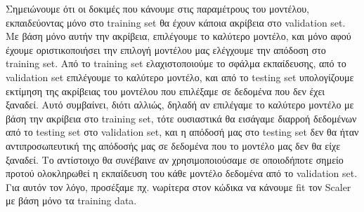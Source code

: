 \noindent Σημειώνουμε ότι οι δοκιμές που κάνουμε στις παραμέτρους του μοντέλου, εκπαιδεύοντας μόνο στο training set θα έχουν κάποια ακρίβεια στο validation set. Με βάση μόνο αυτήν την ακρίβεια, επιλέγουμε το καλύτερο μοντέλο, και μόνο αφού έχουμε οριστικοποιήσει την επιλογή μοντέλου μας ελέγχουμε την απόδοση στο training set. Από το training set ελαχιστοποιούμε το σφάλμα εκπαίδευσης, από το validation set επιλέγουμε το καλύτερο μοντέλο, και από το testing set υπολογίζουμε εκτίμηση της ακρίβειας του μοντέλου που επιλέξαμε σε δεδομένα που δεν έχει ξαναδεί. Αυτό συμβαίνει, διότι αλλιώς, δηλαδή αν επιλέγαμε το καλύτερο μοντέλο με βάση την ακρίβεια στο training set, τότε ουσιαστικά θα εισάγαμε διαρροή δεδομένων από το testing set στο validation set, και η απόδοσή μας στο testing set δεν θα ήταν αντιπροσωπευτική της απόδοσής μας σε δεδομένα που το μοντέλο μας δεν θα είχε ξαναδεί. Το αντίστοιχο θα συνέβαινε αν χρησιμοποιούσαμε σε οποιοδήποτε σημείο προτού ολοκληρωθεί η εκπαίδευση του κάθε μοντέλο δεδομένα από το validation set. Για αυτόν τον λόγο, προσέξαμε πχ. νωρίτερα στον κώδικα να κάνουμε fit τον Scaler με βάση μόνο τα training data.


